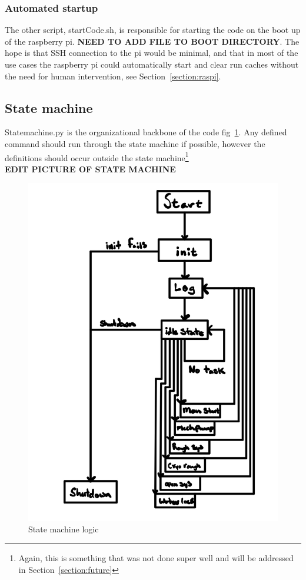 \documentclass{article}
\begin{document}
\subsubsection{Automated startup}
The other script, startCode.sh, is responsible for starting the code on the boot up of the raspberry pi. \textbf{NEED TO ADD FILE TO BOOT DIRECTORY}. The hope is that SSH connection to the pi would be minimal, and that in most of the use cases the raspberry pi could automatically start and clear run caches without the need for human intervention, see Section~\ref{section:raspi}.

\subsection{State machine}
\label{section:state}
Statemachine.py is the organizational backbone of the code fig~\ref{fig:state}. Any defined command should run through the state machine if possible, however the definitions should occur outside the state machine\footnote{Again, this is something that was not done super well and will be addressed in Section~\ref{section:future}}\\ \textbf{EDIT PICTURE OF STATE MACHINE}\

\begin{center}
    \begin{figure}[h!]
      \includegraphics[scale=0.4]{IMG_0432.jpg}
      \caption{State machine logic}
      \label{fig:state}
    \end{figure}
\end{center}
\end{document}

